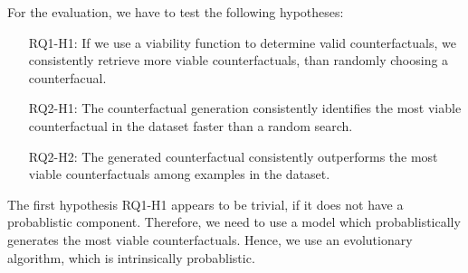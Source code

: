 \documentclass[./../../paper.tex]{subfiles}
\begin{document}
For the evaluation, we have to test the following hypotheses: 
\begin{itemize}
    \item[RQ1-H1:] If we use a viability function to determine valid counterfactuals, we consistently retrieve more viable counterfactuals, than randomly choosing a counterfacual.
    \item[RQ2-H1:] The counterfactual generation consistently identifies the most viable counterfactual in the dataset faster than a random search.
    \item[RQ2-H2:] The generated counterfactual consistently outperforms the most viable counterfactuals among examples in the dataset.  
\end{itemize}

The first hypothesis RQ1-H1 appears to be trivial, if it does not have a probablistic component. Therefore, we need to use a model which probablistically generates the most viable counterfactuals. Hence, we use an evolutionary algorithm, which is intrinsically probablistic. 
\end{document}
